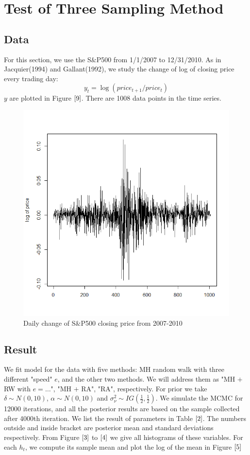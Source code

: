 \documentclass{article}
\begin{document}
\section{Test of Three Sampling Method}
\subsection{Data}
For this section, we use the S$\&$P500 from 1/1/2007 to 12/31/2010. As in Jacquier(1994) and Gallant(1992), we study the change of log of closing price every trading day:
\[
y_t=\log(price_{t+1}/price_t)
\]
$y$ are plotted in Figure $\ref{9}$. There are 1008 data points in the time series.
\begin{figure}
\centering
\includegraphics[scale=0.3]{sp}
\caption{Daily change of S$\&$P500 closing price from 2007-2010}\label{9}
\end{figure}
\subsection{Result}
We fit model for the data with five methods: MH random walk with three different "speed" $e$, and the other two methods. We will address them as "MH $+$ RW with $e=\dots$", "MH $+$ RA", "RA", respectively. For prior we take $\delta\sim N(0,10)$, $\alpha\sim N(0,10)$ and $\sigma_\nu^2\sim IG(\frac{1}{2},\frac{1}{2})$. We simulate the MCMC for 12000 iterations, and all the posterior results are based on the sample collected after 4000th iteration. We list the result of parameters in Table $\ref{2}$. The numbers outside and inside bracket are posterior mean and standard deviations respectively. From Figure $\ref{3}$ to $\ref{4}$ we give all histograms of these variables. For each $h_t$, we compute its sample mean and plot the log of the mean in Figure $\ref{5}$
\end{document}
